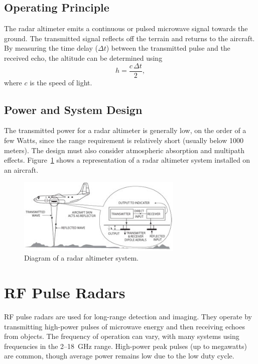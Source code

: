 \documentclass{article}
\begin{document}
\subsection*{Operating Principle}
The radar altimeter emits a continuous or pulsed microwave signal towards the ground. The transmitted signal reflects off the terrain and returns to the aircraft. By measuring the time delay ($\Delta t$) between the transmitted pulse and the received echo, the altitude can be determined using
\begin{equation}
    h = \frac{c \, \Delta t}{2},
\end{equation}
where $c$ is the speed of light.

\subsection*{Power and System Design}
The transmitted power for a radar altimeter is generally low, on the order of a few Watts, since the range requirement is relatively short (usually below 1000 meters). The design must also consider atmospheric absorption and multipath effects. Figure~\ref{fig:radar_altimeter} shows a representation of a radar altimeter system installed on an aircraft.

\begin{figure}[H]
    \centering
    \includegraphics[width=0.7\textwidth]{radar_altimeter_schematic}
    \caption{Diagram of a radar altimeter system.}
    \label{fig:radar_altimeter}
\end{figure}

\section{RF Pulse Radars}
RF pulse radars are used for long-range detection and imaging. They operate by transmitting high-power pulses of microwave energy and then receiving echoes from objects. The frequency of operation can vary, with many systems using frequencies in the 2--18~GHz range. High-power peak pulses (up to megawatts) are common, though average power remains low due to the low duty cycle.
\end{document}
